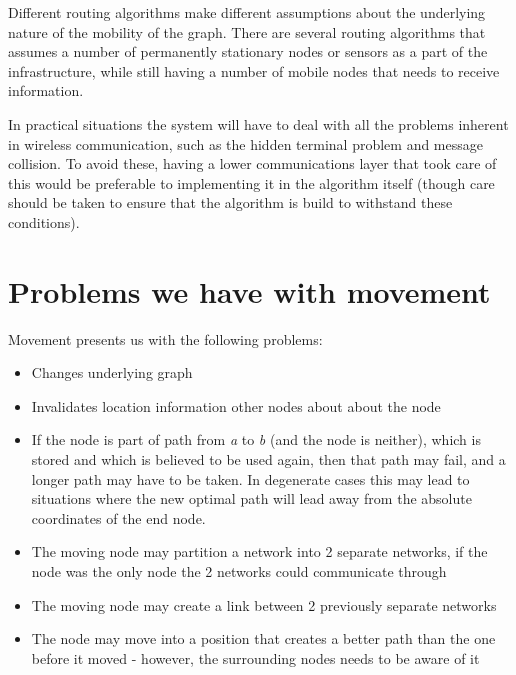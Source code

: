 \documentclass[letter, 12pt, english, draft]{article}
\begin{document}
Different routing algorithms make different assumptions about the underlying nature of the mobility of the graph. There are several routing algorithms \cite{two-tier}\cite{adaptive} that assumes a number of permanently stationary nodes or sensors as a part of the infrastructure, while still having a number of mobile nodes that needs to receive information. 

In practical situations the system will have to deal with all the problems inherent in wireless communication, such as the hidden terminal problem and message collision. To avoid these, having a lower communications layer that took care of this would be preferable to implementing it in the algorithm itself (though care should be taken to ensure that the algorithm is build to withstand these conditions).

\section{Problems we have with movement}

Movement presents us with the following problems:

\begin{itemize}
\item Changes underlying graph
\item Invalidates location information other nodes about about the node
\item If the node is part of path from \emph{a} to \emph{b} (and the node is neither), which is stored and which is believed to be used again, then that path may fail, and a longer path may have to be taken. In degenerate cases this may lead to situations where the new optimal path will lead away from the absolute coordinates of the end node.
\item The moving node may partition a network into 2 separate networks, if the node was the only node the 2 networks could communicate through
\item The moving node may create a link between 2 previously separate networks
\item The node may move into a position that creates a better path than the one before it moved - however, the surrounding nodes needs to be aware of it
\end{itemize}
\end{document}
